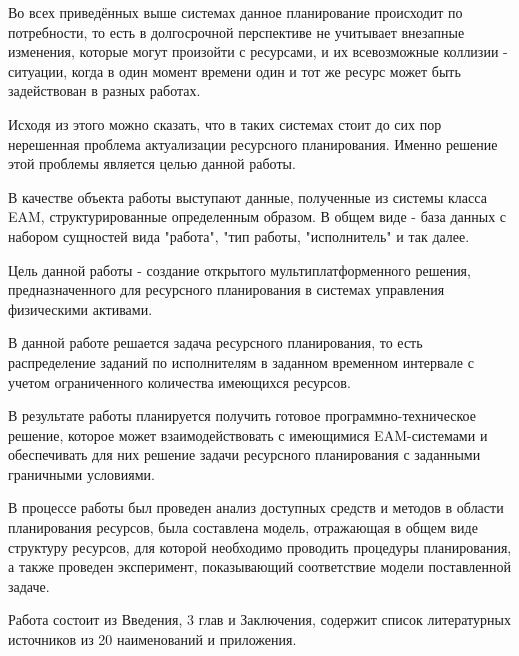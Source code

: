Во всех приведённых выше системах данное планирование происходит по потребности, то есть в долгосрочной перспективе не учитывает внезапные изменения, которые могут произойти с ресурсами, и их всевозможные коллизии - ситуации, когда в один момент времени один и тот же ресурс может быть задействован в разных работах.

Исходя из этого можно сказать, что в таких системах стоит до сих пор нерешенная проблема актуализации ресурсного планирования. Именно решение этой проблемы является целью данной работы.

В качестве объекта работы выступают данные, полученные из системы класса EAM, структурированные определенным образом. В общем виде - база данных с набором сущностей вида "работа", "тип работы, "исполнитель" и так далее.

Цель данной работы - создание открытого мультиплатформенного решения, предназначенного для ресурсного планирования в системах управления физическими активами.

В данной работе решается задача ресурсного планирования, то есть распределение заданий по исполнителям в заданном временном интервале с учетом ограниченного количества имеющихся ресурсов.

В результате работы планируется получить готовое программно-техническое решение, которое может взаимодействовать с имеющимися EAM-системами и обеспечивать для них решение задачи ресурсного планирования с заданными граничными условиями.


В процессе работы был проведен анализ доступных средств и методов в области планирования ресурсов, была составлена модель, отражающая в общем виде структуру ресурсов, для которой необходимо проводить процедуры планирования, а также проведен эксперимент, показывающий соответствие модели поставленной задаче.

Работа состоит из Введения, 3 глав и Заключения, содержит список литературных источников из 20 наименований и приложения.

\clearpage

